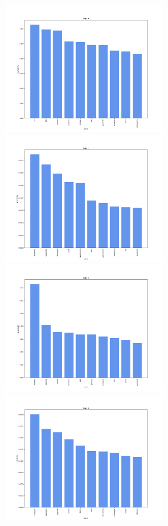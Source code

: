 \documentclass[10pt]{article} %
\begin{document}
		\begin{figure}[H]
		\centering
		\includegraphics[width=7cm]{images/plots/test_5_no_stopwords/topic_0.png}
		\includegraphics[width=7cm]{images/plots/test_5_no_stopwords/topic_1.png}
		\includegraphics[width=7cm]{images/plots/test_5_no_stopwords/topic_2.png}
		\includegraphics[width=7cm]{images/plots/test_5_no_stopwords/topic_3.png}\

\end{figure}
\end{document}

